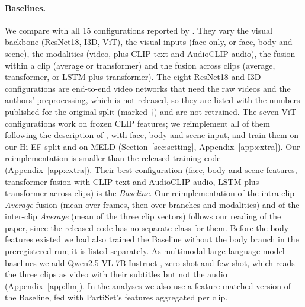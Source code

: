 \documentclass[11pt]{article}
\newcommand{\model}{PartiSet}
\begin{document}
\paragraph{Baselines.} We compare with all 15 configurations reported by \citet{wang2026hief}. They vary the visual
backbone (ResNet18, I3D, ViT), the visual inputs (face only, or face, body and scene), the modalities (video, plus
CLIP text and AudioCLIP audio), the fusion within a clip (average or transformer) and the fusion across clips
(average, transformer, or LSTM plus transformer). The eight ResNet18 and I3D configurations are end-to-end video
networks that need the raw videos and the authors' preprocessing, which is not released, so they are listed with the
numbers published for the original split (marked $\dagger$) and are not retrained. The seven ViT configurations work on
frozen CLIP features; we reimplement all of them following the description of \citet{wang2026hief}, with face, body and
scene input, and train them on our Hi-EF split and on MELD (Section~\ref{sec:setting}, Appendix~\ref{app:extra}). Our
reimplementation is smaller than the released training code (Appendix~\ref{app:extra}). Their best configuration (face, body and scene
features, transformer fusion with CLIP text and AudioCLIP audio, LSTM plus transformer across clips) is the
\emph{Baseline}. Our reimplementation of the intra-clip \emph{Average} fusion (mean over frames, then over branches and
modalities) and of the inter-clip \emph{Average} (mean of the three clip vectors) follows our reading of the paper, since
the released code has no separate class for them. Before the body features existed we had also trained the Baseline
without the body branch in the preregistered run; it is listed separately. As multimodal large language model
baselines we add Qwen2.5-VL-7B-Instruct \citep{bai2025qwen25vl}, zero-shot and few-shot, which reads the three clips as video
with their subtitles but not the audio (Appendix~\ref{app:llm}). In the analyses we also use a feature-matched version of
the Baseline, fed with \model{}'s features aggregated per clip.
\end{document}
